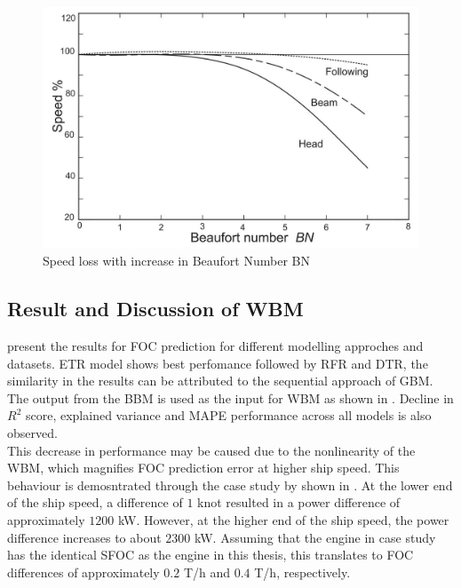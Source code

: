 \begin{figure}
    \centering
    \includegraphics[width=.7\linewidth]{02_figures/molland17_speedlosscurve.jpg}
    \caption{Speed loss with increase in Beaufort Number BN }
    \label{fig:molland17_speedloss_windwave}
\end{figure}


\subsection{Result and Discussion of WBM}\label{sec:WBM_result_discussion}

 present the results for FOC prediction for different modelling approches and datasets. ETR model shows best perfomance followed by RFR and DTR, the similarity in the results can be attributed to the sequential approach of GBM. The output from the BBM is used as the input for WBM as shown in . Decline in $R^2$ score, explained variance and MAPE performance across all models is also observed.\\ 

This decrease in performance may be caused due to the nonlinearity of the WBM, which magnifies FOC prediction error at higher ship speed. This behaviour is demosntrated through the case study by  shown in . At the lower end of the ship speed, a difference of $1$ knot resulted in a power difference of approximately $1200$ kW. However, at the higher end of the ship speed, the power difference increases to about $2300$ kW. Assuming that the engine in  case study has the identical SFOC as the engine in this thesis, this translates to FOC differences of approximately $0.2$ T/h and $0.4$ T/h, respectively.\\

